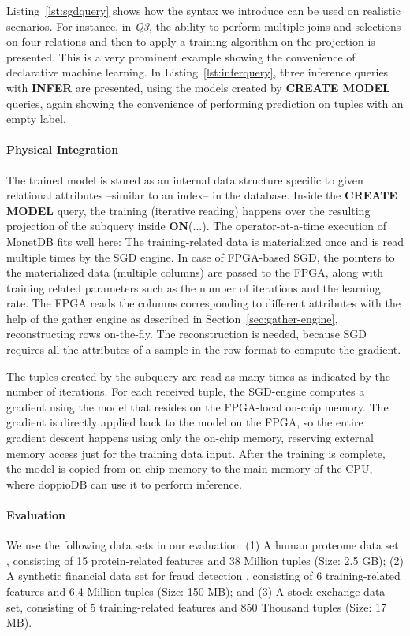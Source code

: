 \documentclass[11pt,dvipdfm]{article}
\begin{document}
Listing~\ref{lst:sgdquery} shows how the syntax we introduce can be used on realistic scenarios. For instance, in \emph{Q3}, the ability to perform multiple joins and selections on four relations and then to apply a training algorithm on the projection is presented. This is a very prominent example showing the convenience of declarative machine learning. In Listing~\ref{lst:inferquery}, three inference queries with \textbf{INFER} are presented, using the models created by \textbf{CREATE MODEL} queries, again showing the convenience of performing prediction on tuples with an empty label.

\paragraph{\textbf{Physical Integration}} The trained model is stored as an internal data structure specific to given relational attributes --similar to an index-- in the database. Inside the \textbf{CREATE MODEL} query, the training (iterative reading) happens over the resulting projection of the subquery inside \textbf{ON}(...). The operator-at-a-time execution of MonetDB fits well here: The training-related data is materialized once and is read multiple times by the SGD engine. In case of FPGA-based SGD, the pointers to the materialized data (multiple columns) are passed to the FPGA, along with training related parameters such as the number of iterations and the learning rate. The FPGA reads the columns corresponding to different attributes with the help of the gather engine as described in Section~\ref{sec:gather-engine}, reconstructing rows on-the-fly. The reconstruction is needed, because SGD requires all the attributes of a sample in the row-format to compute the gradient.

The tuples created by the subquery are read as many times as indicated by the number of iterations. For each received tuple, the SGD-engine computes a gradient using the model that resides on the FPGA-local on-chip memory. The gradient is directly applied back to the model on the FPGA, so the entire gradient descent happens using only the on-chip memory, reserving external memory access just for the training data input. After the training is complete, the model is copied from on-chip memory to the main memory of the CPU, where doppioDB can use it to perform inference.

\paragraph{\textbf{Evaluation}}
We use the following data sets in our evaluation:
(1) A human proteome data set \cite{wilhelm2014mass}, consisting of 15 protein-related features and 38 Million tuples (Size: 2.5 GB); (2) A synthetic financial data set for fraud detection \cite{lopez2016paysim}, consisting of 6 training-related features and 6.4 Million tuples (Size: 150 MB); and (3) A stock exchange data set, consisting of 5 training-related features and 850 Thousand tuples (Size: 17 MB).
\end{document}
